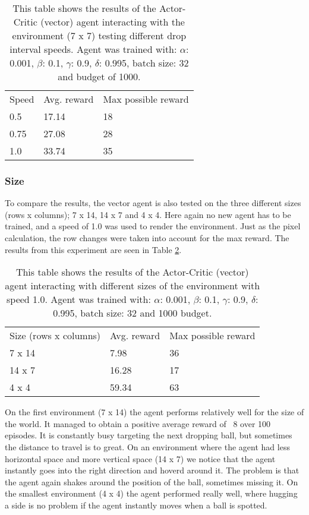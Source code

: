 \documentclass{article}
\begin{document}
    \begin{table}[]
    \begin{tabular}{lll}
    Speed & Avg. reward & Max possible reward \\
    0.5   & 17.14       & 18                  \\
    0.75   & 27.08       & 28                  \\
    1.0   & 33.74        & 35                 
    \end{tabular}
    \caption{This table shows the results of the Actor-Critic (vector) agent interacting with the environment (7 x 7) testing different drop interval speeds. Agent was trained with: $\alpha$: 0.001, $\beta$: 0.1, $\gamma$: 0.9, $\delta$: 0.995, batch size: 32 and budget of 1000. }
    \label{tab:Vector-speed}
    \end{table}
    
    \subsubsection{Size}
    To compare the results, the vector agent is also tested on the three different sizes (rows x columns); 7 x 14, 14 x 7 and 4 x 4. 
    Here again no new agent has to be trained, and a speed of 1.0 was used to render the environment. 
    Just as the pixel calculation, the row changes were taken into account for the max reward. 
    The results from this experiment are seen in Table \ref{tab:Vector-size}.
    
    \begin{table}[]
    \begin{tabular}{lll}
    Size (rows x columns) & Avg. reward & Max possible reward \\
    7 x 14                & 7.98       & 36                  \\
    14 x 7                & 16.28       & 17                  \\
    4 x 4                 & 59.34       & 63                 
    \end{tabular}
    \caption{This table shows the results of the Actor-Critic (vector) agent interacting with different sizes of the environment with speed 1.0. 
    Agent was trained with: $\alpha$: 0.001, $\beta$: 0.1, $\gamma$: 0.9, $\delta$: 0.995, batch size: 32 and 1000 budget. }
    \label{tab:Vector-size}
    \end{table}
    
    On the first environment (7 x 14) the agent performs relatively well for the size of the world.
    It managed to obtain a positive average reward of ~8 over 100 episodes. 
    It is constantly busy targeting the next dropping ball, but sometimes the distance to travel is to great.
    On an environment where the agent had less horizontal space and more vertical space (14 x 7) we notice that the agent instantly goes into the right direction and hoverd around it.
    The problem is that the agent again shakes around the position of the ball, sometimes missing it. 
    On the smallest environment (4 x 4) the agent performed really well, where hugging a side is no problem if the agent instantly moves when a ball is spotted.
    
\end{document}
